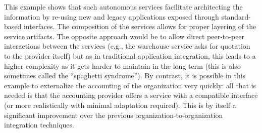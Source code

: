 This example shows that such autonomous services facilitate architecting the information by re-using new and legacy applications exposed through standard-based interfaces. The composition of the services allows for proper layering of the service artifacts. The opposite approach would be to allow direct peer-to-peer interactions between the services (e.g., the warehouse service asks for quotation to the provider itself) but as in traditional application integration, this leads to a higher complexity as it gets harder to maintain in the long term (this is also sometimes called the ``spaghetti syndrome''). By contrast, it is possible in this example to externalize the accounting of the organization very quickly: all that is needed is that the accounting provider offers a service with a compatible interface (or more realistically with minimal adaptation required). This is by itself a significant improvement over the previous organization-to-organization integration techniques. \\

